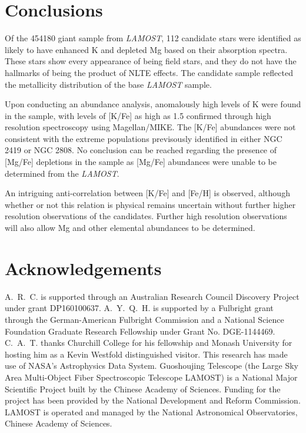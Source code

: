 \documentclass[a4paper,fleqn,usenatbib]{mnras}
\newcommand{\project}[1]{\emph{#1}}
\newcommand{\lamost}{\project{LAMOST}}
\begin{document}
\section{Conclusions}
\label{sec:conclusion}
Of the 454180 giant sample from \lamost, 112 candidate stars were identified as likely to have enhanced K and depleted Mg based on their absorption spectra. These stars show every appearance of being field stars, and they do not have the hallmarks of being the product of NLTE effects. The candidate sample reflected the metallicity distribution of the base \textit{LAMOST} sample.

Upon conducting an abundance analysis, anomalously high levels of K were found in the sample, with levels of [K/Fe] as high as 1.5 confirmed through high resolution spectroscopy using Magellan/MIKE. The [K/Fe] abundances were not consistent with the extreme populations previsously identified in either NGC 2419 or NGC 2808. No conclusion can be reached regarding the presence of [Mg/Fe] depletions in the sample as [Mg/Fe] abundances were unable to be determined from the \lamost.

An intriguing anti-correlation between [K/Fe] and [Fe/H] is observed, although whether or not this relation is physical remains uncertain without further higher resolution observations of the candidates. Further high resolution observations will also allow Mg and other elemental abundances to be determined.

\section*{Acknowledgements}
A.~R.~C. is supported through an Australian Research Council Discovery Project under grant DP160100637.
A.~Y.~Q.~H. is supported by a Fulbright grant through the German-American Fulbright Commission and a National Science Foundation Graduate Research Fellowship under Grant No. DGE-1144469. 
C.~A.~T. thanks Churchill College for his fellowship and Monash University for hosting him as a Kevin Westfold distinguished visitor.
This research has made use of NASA's Astrophysics Data System.
Guoshoujing Telescope (the Large Sky Area Multi-Object Fiber Spectroscopic Telescope LAMOST) is a National Major Scientific Project built by the Chinese Academy of Sciences. Funding for the project has been provided by the National Development and Reform Commission. LAMOST is operated and managed by the National Astronomical Observatories, Chinese Academy of Sciences.









\bsp	%
\label{lastpage}
\end{document}
